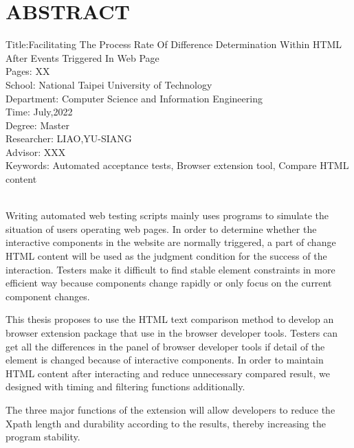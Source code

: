 \chapter*{ABSTRACT}


\noindent
Title:Facilitating The Process Rate Of Difference Determination Within HTML After Events Triggered In Web Page\\
Pages: XX\\  %
School: National Taipei University of Technology\\
Department: Computer Science and Information Engineering\\
Time: July,2022\\
Degree: Master\\
Researcher: LIAO,YU-SIANG\\
Advisor: XXX %
\hspace*{\fill}\\
Keywords: Automated acceptance tests, Browser extension tool, Compare HTML content \\
\hspace*{\fill}\\
\indent %

Writing automated web testing scripts mainly uses programs to simulate the situation of users operating web pages.
In order to determine whether the interactive components in the website are normally triggered, 
a part of change HTML content will be used as the judgment condition for the success of the interaction.
Testers make it difficult to find stable element constraints in more efficient way 
because components change rapidly or only focus on the current component changes.

This thesis proposes to use the HTML text comparison method to develop an browser extension package 
that use in the browser developer tools.
Testers can get all the differences in the panel of browser developer tools if detail of the element is changed because of interactive components.
In order to maintain HTML content after interacting and reduce unnecessary compared result, we designed with timing and filtering functions additionally.

The three major functions of the extension will allow developers to reduce the Xpath length 
and durability according to the results, thereby increasing the program stability.
